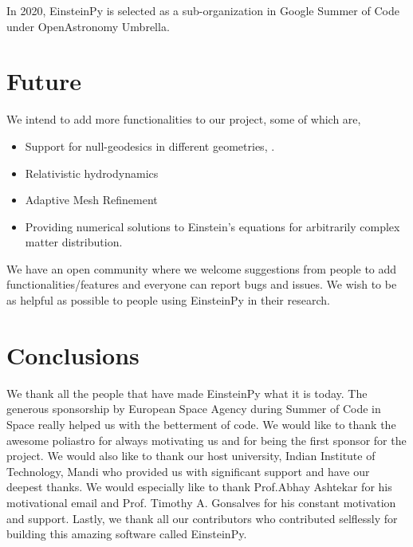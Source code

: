 \documentclass[onecolumn]{aa}
\begin{document}
In 2020, EinsteinPy is selected as a sub-organization in Google Summer of Code under OpenAstronomy Umbrella. 

\section{Future} \label{sec:FUTURE}
We intend to add more functionalities to our project, some of which are, 
\begin{itemize}
\item Support for null-geodesics in different geometries, . 
\item Relativistic hydrodynamics
\item Adaptive Mesh Refinement 
\item Providing numerical solutions to Einstein’s equations for arbitrarily complex matter distribution.
\end{itemize}

We have an open community where we welcome suggestions from people to add functionalities/features and everyone can report bugs and issues. We wish to be as helpful as possible to people using EinsteinPy in their research.


\section{Conclusions}




\begin{acknowledgements}
      We thank all the people that have made EinsteinPy what it is today.  
The generous sponsorship by European Space Agency during Summer of Code in Space really helped us with the betterment of code. We would like to thank the awesome poliastro \citep{juan_luis_cano_rodriguez_2019_3588160} for always motivating us and for being the first sponsor for the project. We would also like to thank our host university, Indian Institute of Technology, Mandi who provided us with significant support and have our deepest thanks.
We would especially like to thank Prof.Abhay Ashtekar for his motivational email and  Prof. Timothy A. Gonsalves for his constant motivation and support.
Lastly, we thank all our contributors who contributed selflessly for building this amazing software called EinsteinPy.
      
\end{acknowledgements}

%
%





\end{document}
